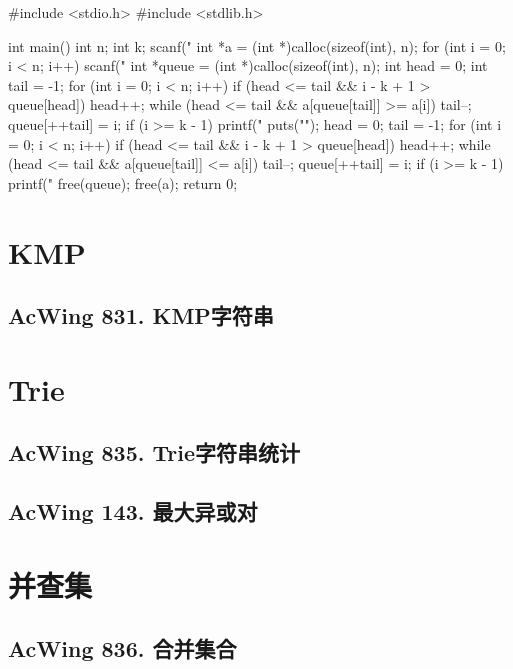 \begin{mycpptwocol}
#include <stdio.h>
#include <stdlib.h>

int main()
{
    int n;
    int k;
    scanf("%
    int *a = (int *)calloc(sizeof(int), n);
    for (int i = 0; i < n; i++) {
        scanf("%
    }
    int *queue = (int *)calloc(sizeof(int), n);
    int head = 0;
    int tail = -1;
    for (int i = 0; i < n; i++) {
        if (head <= tail && i - k + 1 > queue[head]) {
            head++;
        }
        while (head <= tail && a[queue[tail]] >= a[i]) {
            tail--;
        }
        queue[++tail] = i;
        if (i >= k - 1) {
            printf("%
        }
    }
    puts("");
    head = 0;
    tail = -1;
    for (int i = 0; i < n; i++) {
        if (head <= tail && i - k + 1 > queue[head]) {
            head++;
        }
        while (head <= tail && a[queue[tail]] <= a[i]) {
            tail--;
        }
        queue[++tail] = i;
        if (i >= k - 1) {
            printf("%
        }
    }
    free(queue);
    free(a);
    return 0;
}
\end{mycpptwocol}
\section{KMP}
\subsection{AcWing 831. KMP字符串}

\section{Trie}
\subsection{AcWing 835. Trie字符串统计}
\subsection{AcWing 143. 最大异或对}

\section{并查集}
\subsection{AcWing 836. 合并集合}

